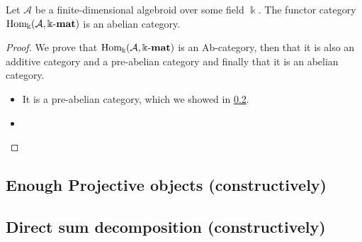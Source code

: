 \begin{theorem}
Let $\mathcal{A}$ be a finite-dimensional algebroid over some field $\Bbbk$. The functor category $\mathrm{Hom_{\Bbbk}}(\mathcal{A},\Bbbk\textnormal{-}\mathbf{mat})$
is an abelian category.
\end{theorem}
\begin{proof}
We prove that $\mathrm{Hom_{\Bbbk}}(\mathcal{A},\Bbbk\textnormal{-}\mathbf{mat})$ is an Ab-category, then that it is also an additive category and a pre-abelian category and finally that
it is an abelian category.
\begin{itemize}
\renewcommand{\labelenumi}{(\theenumi)}
\item It is a pre-abelian category, which we showed in \ref{}.
\item 
\end{itemize}
\end{proof}

\subsection{Enough Projective objects (constructively)}

\subsection{Direct sum decomposition (constructively)}

